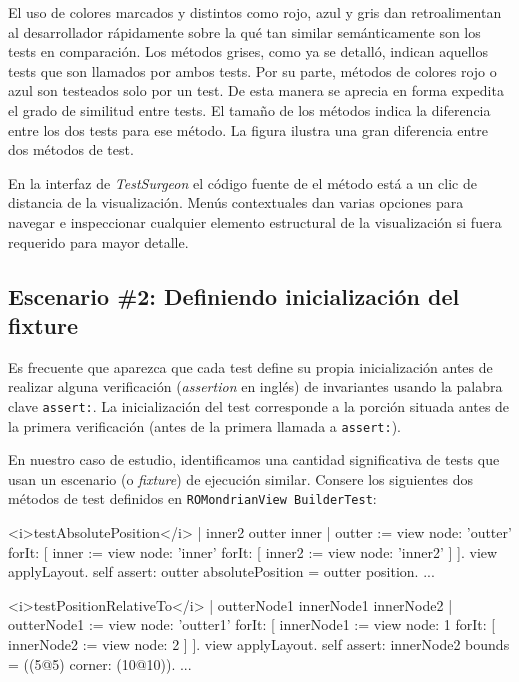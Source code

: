 El uso de colores marcados y distintos como rojo, azul y gris dan retroalimentan al desarrollador rápidamente sobre la qué tan similar semánticamente son los tests en comparación. Los métodos grises, como ya se detalló, indican aquellos tests que son llamados por ambos tests. Por su parte, métodos de colores rojo o azul son testeados solo por un test. De esta manera se aprecia en forma expedita el grado de similitud entre tests. El tamaño de los métodos indica la diferencia entre los dos tests para ese método. La figura  ilustra una gran diferencia entre dos métodos de test.

En la interfaz de \emph{TestSurgeon} el código fuente de el método está a un clic de distancia de la visualización. Menús contextuales dan varias opciones para navegar e inspeccionar cualquier elemento estructural de la visualización si fuera requerido para mayor detalle.


\subsection{Escenario \#2: Definiendo inicialización del fixture}

\par Es frecuente que aparezca que cada test define su propia inicialización antes de realizar alguna verificación (\emph{assertion} en inglés) de invariantes usando la palabra clave {\tt assert:}. La inicialización del test corresponde a la porción situada antes de la primera verificación (\ie antes de la primera llamada a {\tt assert:}).

\par En nuestro caso de estudio, identificamos una cantidad significativa de tests que usan un escenario (o \emph{fixture}) de ejecución similar. Consere los siguientes dos métodos de test definidos en {\tt ROMondrianView BuilderTest}:

\begin{codeWithLineNumbers}
<i>testAbsolutePosition</i>
	| inner2 outter inner |
	outter := view node: 'outter' forIt: [
		inner := view node: 'inner' forIt: [
			inner2 := view node: 'inner2'
		]
	].
	view applyLayout.
	self assert: outter absolutePosition = outter position.
	...


<i>testPositionRelativeTo</i>
	| outterNode1 innerNode1 innerNode2 |
	outterNode1 := view node: 'outter1' forIt: 
		[ innerNode1 := view node: 1 forIt: [ 
		innerNode2 := view node: 2 ] ].
	view applyLayout.
	self assert: innerNode2 bounds = ((5@5) corner: (10@10)).
	...
\end{codeWithLineNumbers}

